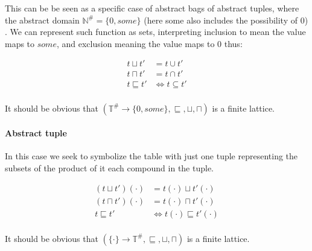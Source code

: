 This can be be seen as a specific case of abstract bags of abstract tuples, where the abstract domain $\mathbb{N}^\# = \{0, some\}$ (here some also includes the possibility of $0$) .
We can represent such function as sets, interpreting inclusion to mean the value maps to $some$, and exclusion meaning the value maps to $0$ thus:

\begin{align*}
    t \sqcup t' &= t \cup t' \\
    t \sqcap t' &= t \cap t' \\
    t \sqsubseteq t' &\iff t \subseteq t' \\
\end{align*}

It should be obvious that $(\mathbb{T}^\# \rightarrow \{0, some\}, \sqsubseteq, \sqcup, \sqcap)$ is a finite lattice.

\paragraph{Abstract tuple}

In this case we seek to symbolize the table with just one tuple representing the subsets of the product of it each compound in the tuple.

\begin{align*}
    (t \sqcup t')(\cdot) &= t(\cdot) \sqcup t'(\cdot) \\
    (t \sqcap t')(\cdot) &= t(\cdot) \sqcap t'(\cdot) \\
    t \sqsubseteq t' &\iff t(\cdot) \sqsubseteq t'(\cdot) \\
\end{align*}

It should be obvious that $(\{\cdot\} \rightarrow \mathbb{T}^\#, \sqsubseteq, \sqcup, \sqcap)$ is a finite lattice.
